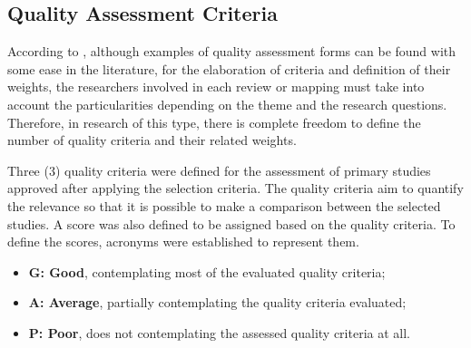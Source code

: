  
\subsection{Quality Assessment Criteria} \label{ssec_slm:qualityCriteria}

According to \cite{Nakagawa:2017}, although examples of quality assessment forms can be found with some ease in the literature, for the elaboration of criteria and definition of their weights, the researchers involved in each review or mapping must take into account the particularities depending on the theme and the research questions.
Therefore, in research of this type, there is complete freedom to define the number of quality criteria and their related weights.

Three (3) quality criteria were defined for the assessment of primary studies approved after applying the selection criteria.
The quality criteria aim to quantify the relevance so that it is possible to make a comparison between the selected studies.
A score was also defined to be assigned based on the quality criteria.
To define the scores, acronyms were established to represent them.

\begin{itemize}
     \item \textbf{G: Good}, contemplating most of the evaluated quality criteria;
     \item \textbf{A: Average}, partially contemplating the quality criteria evaluated;
     \item \textbf{P: Poor}, does not contemplating the assessed quality criteria at all.
\end{itemize}

